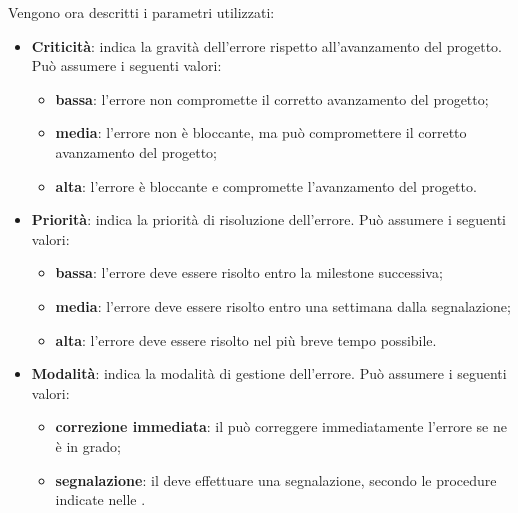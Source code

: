 Vengono ora descritti i parametri utilizzati:
\begin{itemize}
	\item \textbf{Criticità}: indica la gravità dell'errore rispetto all'avanzamento del progetto. Può assumere i seguenti valori:
	\begin{itemize}
		\item \textbf{bassa}: l'errore non compromette il corretto avanzamento del progetto;
		\item \textbf{media}: l'errore non è bloccante, ma può compromettere il corretto avanzamento del progetto;
		\item \textbf{alta}: l'errore è bloccante e compromette l'avanzamento del progetto.	
	\end{itemize}
	\item \textbf{Priorità}: indica la priorità di risoluzione dell'errore. Può assumere i seguenti valori:
	\begin{itemize}
		\item \textbf{bassa}: l'errore deve essere risolto entro la milestone successiva;
		\item \textbf{media}: l'errore deve essere risolto entro una settimana dalla segnalazione;
		\item \textbf{alta}: l'errore deve essere risolto nel più breve tempo possibile.
	\end{itemize}
	\item \textbf{Modalità}: indica la modalità di gestione dell'errore. Può assumere i seguenti valori:
	\begin{itemize}
		\item \textbf{correzione immediata}: il \Verificatore{} può correggere immediatamente l'errore se ne è in grado;
		\item \textbf{segnalazione}: il \Verificatore{} deve effettuare una segnalazione, secondo le procedure indicate nelle \NormeDiProgetto{}.
	\end{itemize}
\end{itemize}

